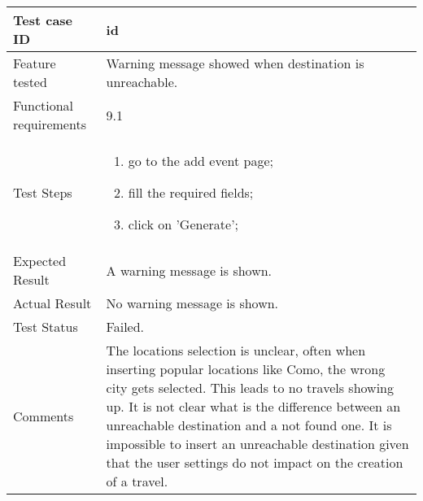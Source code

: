 \begin{table}[H]
	\begin{center}
		\begin{tabular}{ | p{} | p{} | }
		\hline
		Test case ID & id\\
		\hline
		Feature tested & Warning message showed when destination is unreachable.\\
    	\hline
		Functional requirements & 9.1  \\
		\hline
		Test Steps & 
			\begin{enumerate}
				\item go to the add event page;
				\item fill the required fields;
				\item click on 'Generate';
			\end{enumerate} \\
		\hline
		Expected Result & A warning message is shown.\\
		\hline
		Actual Result & No warning message is shown.\\ 
		\hline
		Test Status & \color{Red}Failed.\\ 
		\hline
		Comments & The locations selection is unclear, often when inserting popular locations like Como, the wrong city gets selected. This leads to no travels showing up. It is not clear what is the difference between an unreachable destination and a not found one. It is impossible to insert an unreachable destination given that the user settings do not impact on the creation of a travel. \\
		\hline
		
		\end{tabular}
	\end{center}
\end{table}

